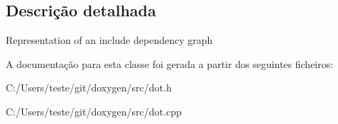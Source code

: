 \subsection{Descrição detalhada}
Representation of an include dependency graph 

A documentação para esta classe foi gerada a partir dos seguintes ficheiros\-:\begin{DoxyCompactItemize}
\item 
C\-:/\-Users/teste/git/doxygen/src/dot.\-h\item 
C\-:/\-Users/teste/git/doxygen/src/dot.\-cpp\end{DoxyCompactItemize}
